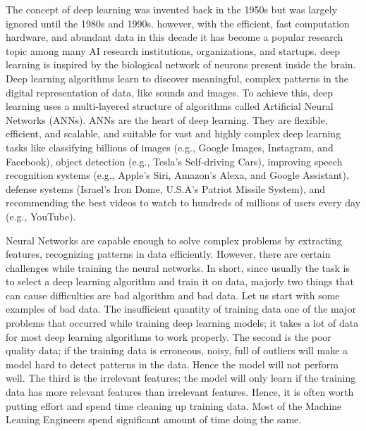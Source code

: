 The concept of deep learning was invented back in the 1950s but was largely ignored until the 1980s and 1990s. however, with the efficient, fast computation hardware, and abundant data in this decade it has become a popular research topic among many \ac{AI} research institutions, organizations, and startups. deep learning is inspired by the biological network of neurons present inside the brain. Deep learning algorithms learn to discover meaningful, complex patterns in the digital representation of data, like sounds and images. To achieve this, deep learning uses a multi-layered structure of algorithms called Artificial Neural Networks (\acp{ANN}). \acp{ANN} are the heart of deep learning. They are flexible, efficient, and scalable, and suitable for vast and highly complex deep learning tasks like classifying billions of images (e.g., Google Images, Instagram, and Facebook), object detection (e.g., Tesla's Self-driving Cars), improving speech recognition systems (e.g., Apple's Siri, Amazon's Alexa, and Google Assistant), defense systems (Israel's Iron Dome, U.S.A's Patriot Missile System), and recommending the best videos to watch to hundreds of millions of users every day (e.g., YouTube).

Neural Networks are capable enough to solve complex problems by extracting features, recognizing patterns in data efficiently. However, there are certain challenges while training the neural networks. In short, since usually the task is to select a deep learning algorithm and train it on data, majorly two things that can cause difficulties are bad algorithm and bad data. Let us start with some examples of bad data. The insufficient quantity of training data one of the major problems that occurred while training deep learning models; it takes a lot of data for most deep learning algorithms to work properly. The second is the poor quality data; if the training data is erroneous, noisy, full of outliers will make a model hard to detect patterns in the data. Hence the model will not perform well. The third is the irrelevant features; the model will only learn if the training data has more relevant features than irrelevant features. Hence, it is often worth putting effort and spend time cleaning up training data. Most of the Machine Leaning Engineers spend significant amount of time doing the same. 

